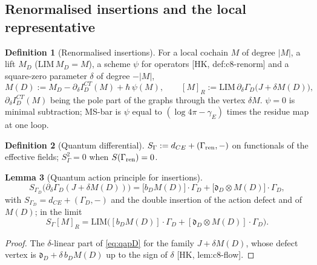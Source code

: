 \documentclass[11pt]{article}
\theoremstyle{definition}
\newtheorem{definition}{Definition}[section]
\newtheorem{lemma}[definition]{Lemma}
\numberwithin{equation}{section}
\begin{document}
\subsection{Renormalised insertions and the local representative}

\begin{definition}[Renormalised insertions]
\label{def:insert}
For a local cochain $M$ of degree $|M|$, a lift $M_D$ ($\mathrm{LIM}\,M_D=M$), a scheme $\psi$ for operators [HK, def:c8-renorm] and a square-zero parameter $\delta$ of degree $-|M|$,
\[
M(D):=M_D-\partial_\delta I^{CT}_D(M)+\hbar\,\psi(M),\qquad [M]_R:=\mathrm{LIM}\,\partial_\delta\Gamma_D\big(J+\delta M(D)\big),
\]
$\partial_\delta I^{CT}_D(M)$ being the pole part of the graphs through the vertex $\delta M$. $\psi=0$ is minimal subtraction; MS-bar is $\psi$ equal to $(\log4\pi-\gamma_E)$ times the residue map at one loop.
\end{definition}

\begin{definition}[Quantum differential]
\label{def:SGamma}
$S_\Gamma:=d_{CE}+(\Gamma_{\rm ren},-)$ on functionals of the effective fields; $S_\Gamma^2=0$ when $S(\Gamma_{\rm ren})=0$.
\end{definition}

\begin{lemma}[Quantum action principle for insertions]
\label{lem:qapO}
\[
S_{\Gamma_D}\big(\partial_\delta\Gamma_D(J+\delta M(D))\big)=\big[b_DM(D)\big]\cdot\Gamma_D+\big[\mathfrak d_D\otimes M(D)\big]\cdot\Gamma_D,
\]
with $S_{\Gamma_D}=d_{CE}+(\Gamma_D,-)$ and the double insertion of the action defect and of $M(D)$; in the limit
\[
S_\Gamma[M]_R=\mathrm{LIM}\Big([b_DM(D)]\cdot\Gamma_D+[\mathfrak d_D\otimes M(D)]\cdot\Gamma_D\Big).
\]
\end{lemma}

\begin{proof}
The $\delta$-linear part of \eqref{eq:qapD} for the family $J+\delta M(D)$, whose defect vertex is $\mathfrak d_D+\delta\,b_DM(D)$ up to the sign of $\delta$ [HK, lem:c8-flow].
\end{proof}
\end{document}
